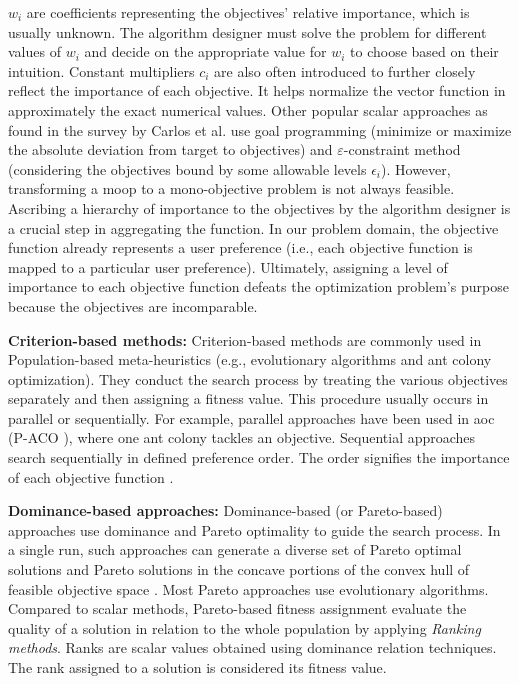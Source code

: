 $w_i$ are coefficients representing the objectives' relative importance, which is usually unknown. The algorithm designer must solve the problem for different values of $w_i$ and decide on the appropriate value for $w_i$ to choose based on their intuition. Constant multipliers $c_i$ are also often introduced to further closely reflect the importance of each objective. It helps normalize the vector function in approximately the exact numerical values.
Other popular scalar approaches as found in the survey by Carlos et al. \parencite{CoelloCoello1999ATechniquesc} use goal programming (minimize or maximize the absolute deviation from target to objectives) and $\varepsilon$-constraint method (considering the objectives bound by some allowable levels $\epsilon_i$). However, transforming a \gls{moop} to a mono-objective problem is not always feasible. Ascribing a hierarchy of importance to the objectives by the algorithm designer is a crucial step in aggregating the function. In our problem domain, the objective function already represents a user preference (i.e., each objective function is mapped to a particular user preference). Ultimately, assigning a level of importance to each objective function defeats the optimization problem's purpose because the objectives are incomparable.

\textbf{Criterion-based methods: }
Criterion-based methods are commonly used in Population-based meta-heuristics (e.g., evolutionary algorithms and ant colony optimization). They conduct the search process by treating the various objectives separately and then assigning a fitness value. This procedure usually occurs in parallel or sequentially. For example, parallel approaches have been used in \gls{aoc} (P-ACO \parencite{Doerner2004ParetoSelection}), where one ant colony tackles an objective. Sequential approaches search sequentially in defined preference order. The order signifies the importance of each objective function \parencite{Fishburn1974ExceptionalSurvey}.

\textbf{Dominance-based approaches: }
Dominance-based (or Pareto-based) approaches use dominance and Pareto optimality to guide the search process. In a single run, such approaches can generate a diverse set of Pareto optimal solutions and Pareto solutions in the concave portions of the convex hull of feasible objective space \parencite{Talbi2009Metaheuristics:Implementation}. Most Pareto approaches use evolutionary algorithms. Compared to scalar methods, Pareto-based fitness assignment evaluate the quality of a solution in relation to the whole population by applying \textit{ Ranking methods}. Ranks are scalar values obtained using dominance relation techniques. The rank assigned to a solution is considered its fitness value.


